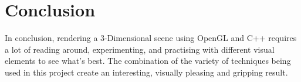 \documentclass[10pt, a4paper]{article}
\begin{document}
	
\section{Conclusion}	

	In conclusion, rendering a 3-Dimensional scene using OpenGL and C++ requires a lot of reading around, experimenting, and practising with different visual elements to see what's best. The combination of the variety of techniques being used in this project create an interesting, visually pleasing and gripping result.
	
	




		
\end{document}
